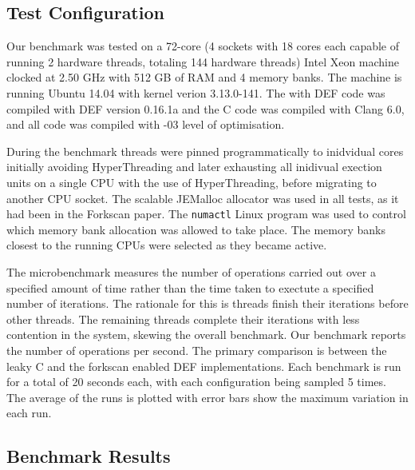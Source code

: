 \subsection{Test Configuration}

Our benchmark was tested on a 72-core (4 sockets with 18 cores each capable of running 2 hardware threads, totaling 144 hardware threads) Intel Xeon machine clocked at 2.50 GHz with 512 GB of RAM and 4 memory banks. The machine is running Ubuntu 14.04 with kernel verion 3.13.0-141. The with DEF code was compiled with DEF version 0.16.1a and the C code was compiled with Clang 6.0, and all code was compiled with -03 level of optimisation.

During the benchmark threads were pinned programmatically to inidvidual cores initially avoiding HyperThreading and later exhausting all inidivual exection units on a single CPU with the use of HyperThreading, before migrating to another CPU socket. The scalable JEMalloc\cite{JEMalloc} allocator was used in all tests, as it had been in the Forkscan paper.\cite{Forkscan} The \texttt{numactl} Linux program was used to control which memory bank allocation was allowed to take place. The memory banks closest to the running CPUs were selected as they became active.

The microbenchmark measures the number of operations carried out over a specified amount of time rather than the time taken to exectute a specified number of iterations. The rationale for this is threads finish their iterations before other threads. The remaining threads complete their iterations with less contention in the system, skewing the overall benchmark. Our benchmark reports the number of operations per second. The primary comparison is between the leaky C and the forkscan enabled DEF implementations. Each benchmark is run for a total of 20 seconds each, with each configuration being sampled 5 times. The average of the runs is plotted with error bars show the maximum variation in each run.

\subsection{Benchmark Results}

